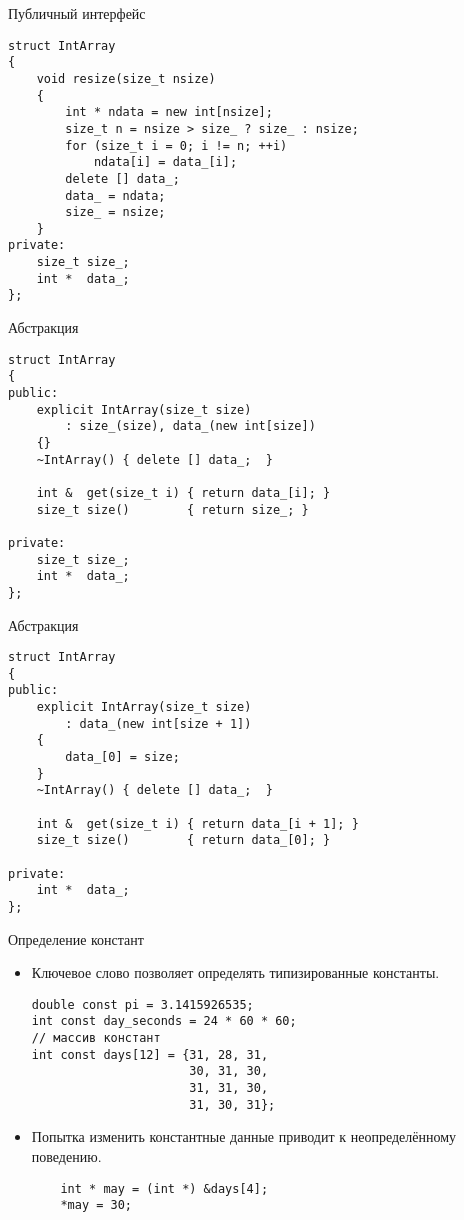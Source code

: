\documentclass{beamer}
\begin{document}
\begin{frame}[fragile]{Публичный интерфейс}{}
\begin{lstlisting}
struct IntArray 
{
    void resize(size_t nsize) 
    {
        int * ndata = new int[nsize];
        size_t n = nsize > size_ ? size_ : nsize;
        for (size_t i = 0; i != n; ++i)
            ndata[i] = data_[i];
        delete [] data_;
        data_ = ndata;
        size_ = nsize;
    }
private:
    size_t size_;
    int *  data_;
};
\end{lstlisting}
\end{frame}

\begin{frame}[fragile]{Абстракция}{}
\begin{lstlisting}
struct IntArray 
{
public:
    explicit IntArray(size_t size) 
        : size_(size), data_(new int[size]) 
    {}
    ~IntArray() { delete [] data_;  }

    int &  get(size_t i) { return data_[i]; }
    size_t size()        { return size_; }

private:
    size_t size_;
    int *  data_;
};
\end{lstlisting}
\end{frame}

\begin{frame}[fragile]{Абстракция}{}
\begin{lstlisting}
struct IntArray 
{
public:
    explicit IntArray(size_t size) 
        : data_(new int[size + 1]) 
    {
        data_[0] = size;
    }
    ~IntArray() { delete [] data_;  }

    int &  get(size_t i) { return data_[i + 1]; }
    size_t size()        { return data_[0]; }

private:
    int *  data_;
};
\end{lstlisting}
\end{frame}

\begin{frame}[fragile]{Определение констант}{}
    \begin{itemize}
        \item Ключевое слово  позволяет
            определять типизированные константы.
\begin{lstlisting}
double const pi = 3.1415926535;
int const day_seconds = 24 * 60 * 60;   
// массив констант
int const days[12] = {31, 28, 31,
                      30, 31, 30,
                      31, 31, 30,
                      31, 30, 31};
\end{lstlisting}
        \item Попытка изменить константные данные приводит к неопределённому
            поведению.
\begin{lstlisting}
    int * may = (int *) &days[4];
    *may = 30;
\end{lstlisting}
    \end{itemize}
\end{frame}
\end{document}
